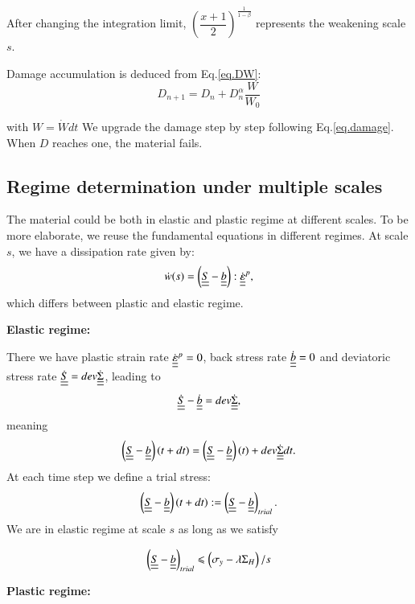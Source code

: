 \documentclass[3p,times,number,review]{elsarticle}
\begin{document}
After changing the integration limit, $\left( \dfrac{x+1}{2}\right) ^{\frac{1}{1-\beta}}$ represents the weakening scale $s$. 

Damage accumulation is deduced from Eq.\eqref{eq.DW}:
\begin{equation}
D_{n+1}=D_n+D_n^\alpha\dfrac{W}{W_0}
\label{eq.damage}
\end{equation}

with $W=\dot{W}dt$
We upgrade the damage step by step following Eq.\eqref{eq.damage}. When $D$ reaches one, the material fails. 

\subsection{Regime determination under multiple scales}
The material could be both in elastic and plastic regime at different scales. To be more elaborate, we reuse the fundamental equations in different regimes. At scale $s$, we have a dissipation rate given by:
$$\dot{w}(s)=\left( \uline{\uline{S}}-\uline{\uline{b}}\right):\dot{\uline{\uline{\varepsilon}}}^p, $$
which differs between plastic and elastic regime.

\vspace{6pt}
\noindent
\textbf{Elastic regime:}

\vspace{6pt}
\noindent
There we have
plastic strain rate
$\dot{\uline{\uline{\varepsilon}}}^p=0$, back stress rate $\dot{\uline{\uline{b}}}=0$ and deviatoric stress rate $\dot{\uline{\uline{S}}}=dev\dot{\uline{\uline{\Sigma}}}$, leading to
$$\dot{\uline{\uline{S}}}-\dot{\uline{\uline{b}}}=dev\dot{\uline{\uline{\Sigma}}},$$ 
meaning
$$\left( \uline{\uline{S}}-\uline{\uline{b}}\right) (t+dt)=\left( \uline{\uline{S}}-\uline{\uline{b}}\right) (t)+dev\dot{\uline{\uline{\Sigma}}}dt.$$
At each time step we define a trial stress:
\begin{equation}
\left( \uline{\uline{S}}-\uline{\uline{b}}\right)(t+dt):=\left( \uline{\uline{S}}-\uline{\uline{b}}\right)_{trial}.
\label{trial}
\end{equation}
We are in elastic regime at scale $s$ as long as we satisfy

$$\left( \uline{\uline{S}}-\uline{\uline{b}}\right)_{trial}\leqslant\left( \sigma_y-\lambda \Sigma_H\right)/s  $$

\vspace{6pt}
\noindent
\textbf{Plastic regime:}
\end{document}
